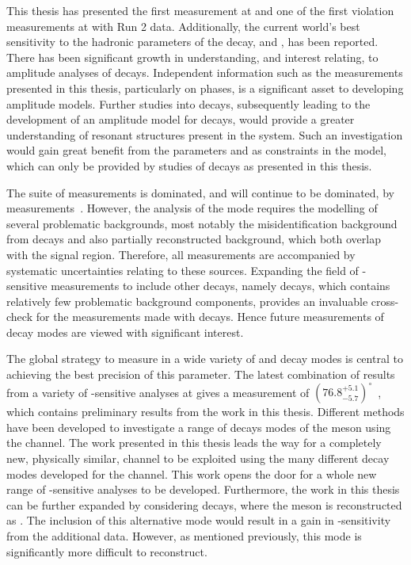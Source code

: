 This thesis has presented the first \btodkst measurement at \lhcb and one of the first \CP violation measurements at \lhcb with Run 2 data. Additionally, the current world's best sensitivity to the hadronic parameters of the \Bm decay, \rb and \deltab, has been reported. There has been significant growth in understanding, and interest relating, to amplitude analyses of \B decays. Independent information such as the measurements presented in this thesis, particularly on phases, is a significant asset to developing amplitude models. Further studies into \btodkst decays, subsequently leading to the development of an amplitude model for \decay{\Bm}{\D\KS\pim} decays, would provide a greater understanding of resonant structures present in the \KS\pim system. Such an investigation would gain great benefit from the parameters \rb and \deltab as constraints in the model, which can only be provided by studies of \btodkst decays as presented in this thesis. 

The suite of \Pgamma measurements is dominated, and will continue to be dominated, by \decay{\Bm}{\D\Km} measurements~\cite{LHCb-CONF-2017-004}. However, the analysis of the \decay{\Bm}{\D\Km} mode requires the modelling of several problematic backgrounds, most notably the misidentification background from \decay{\Bm}{\D\pim} decays and also partially reconstructed background, which both overlap with the signal region. Therefore, all \decay{\Bm}{\D\Km} measurements are accompanied by systematic uncertainties relating to these sources. Expanding the field of \Pgamma-sensitive measurements to include other \Bm decays, namely \decay{\Bm}{\D\Kstarm} decays, which contains relatively few problematic background components, provides an invaluable cross-check for the \Pgamma measurements made with \decay{\Bm}{\D\Km} decays. Hence future measurements of \decay{\Bm}{\D\Kstarm} decay modes are viewed with significant interest.

The global strategy to measure \Pgamma in a wide variety of \B and \D decay modes is central to achieving the best precision of this parameter. The latest combination of results from a variety of \Pgamma-sensitive analyses at \lhcb gives a measurement of $\left(76.8^{+5.1}_{-5.7}\right)^{\circ}$~\cite{LHCb-CONF-2017-004}, which contains preliminary results from the work in this thesis. Different methods have been developed to investigate a range of decays modes of the \Dz meson using the \decay{\Bm}{\D\Km} channel. The work presented in this thesis leads the way for a completely new, physically similar, \decay{\Bm}{\D\Kstarm} channel to be exploited using the many different \D decay modes developed for the \decay{\Bm}{\D\Km} channel. This work opens the door for a whole new range of \Pgamma-sensitive analyses to be developed. Furthermore, the work in this thesis can be further expanded by considering \decay{\Bm}{\D\Kstarm} decays, where the \Kstarm meson is reconstructed as \Km\piz. The inclusion of this alternative mode would result in a gain in \Pgamma-sensitivity from the additional data. However, as mentioned previously, this mode is significantly more difficult to reconstruct.

